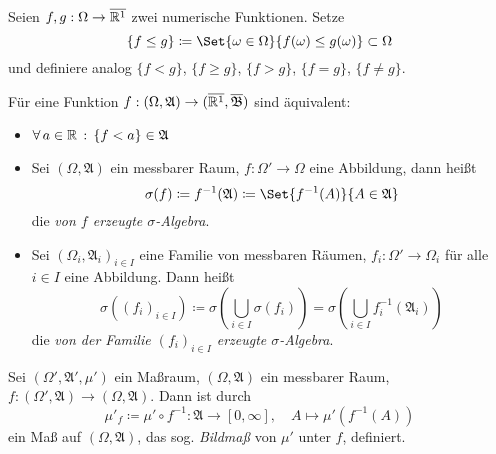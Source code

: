 \documentclass{cheat-sheet}
\newcommand{\Alg}{\mathfrak{A}} %
\newcommand{\Bor}{\mathfrak{B}} %
\renewcommand{\ER}{\overline{\R^1}} %
\begin{document}
\begin{nota}
  Seien $f, g : \Omega \to \ER$ zwei numerische Funktionen. Setze
    \[ \{ f \leq g \} \coloneqq \Set{ \omega \in \Omega }{ f(\omega) \leq g(\omega) } \subset \Omega \]
  und definiere analog $\{ f < g \}$, $\{ f \geq g \}$, $\{ f > g \}$, $\{ f = g \}$, $\{ f \not= g \}$.
\end{nota}

\begin{satz}
  Für eine Funktion $f : (\Omega, \Alg) \to (\ER, \overline{\Bor})$ sind äquivalent:
  \begin{itemize}
    \miniitem{0.7 \linewidth}{$\forall \, a \in \R \,:\, \{ f \geq a \} = f^{-1}([a, \infty]) \in \Alg$}
    \item $\fa{a \in \R} \{ f < a \} \in \Alg$
  \end{itemize}
\end{satz}

\begin{defn}
  \begin{itemize}
    \item Sei $(\Omega, \Alg)$ ein messbarer Raum, $f : \Omega' \to \Omega$ eine Abbildung, dann heißt
    \[ \sigma(f) \coloneqq f^{-1}(\Alg) \coloneqq \Set{ f^{-1}(A) }{ A \in \Alg } \]
    die \emph{von $f$ erzeugte $\sigma$-Algebra}.
    \item Sei $(\Omega_i, \Alg_i)_{i \in I}$ eine Familie von messbaren Räumen, $f_i : \Omega' \to \Omega_i$ für alle $i \in I$ eine Abbildung. Dann heißt
    \[ \sigma((f_i)_{i \in I}) \coloneqq \sigma(\bigcup_{i \in I} \sigma(f_i)) = \sigma(\bigcup_{i \in I} f_i^{-1}(\Alg_i)) \]
    die \emph{von der Familie $(f_i)_{i \in I}$ erzeugte $\sigma$-Algebra}.
  \end{itemize}
\end{defn}

\begin{defn}
  Sei $(\Omega', \Alg', \mu')$ ein Maßraum, $(\Omega, \Alg)$ ein messbarer Raum, $f : (\Omega', \Alg) \to (\Omega, \Alg)$. Dann ist durch
  \[ \mu'_f \coloneqq \mu' \circ f^{-1} : \Alg \to [0, \infty], \quad A \mapsto \mu'(f^{-1}(A)) \]
  ein Maß auf $(\Omega, \Alg)$, das sog. \emph{Bildmaß} von $\mu'$ unter $f$, definiert.
\end{defn}
\end{document}
